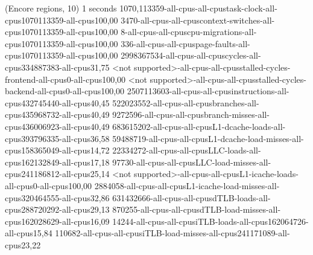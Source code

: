 (Encore regions, 10)
1 seconds
1070,113359-all-cpus-all-cpustask-clock-all-cpus1070113359-all-cpus100,00
3470-all-cpus-all-cpuscontext-switches-all-cpus1070113359-all-cpus100,00
8-all-cpus-all-cpuscpu-migrations-all-cpus1070113359-all-cpus100,00
336-all-cpus-all-cpuspage-faults-all-cpus1070113359-all-cpus100,00
2998367534-all-cpus-all-cpuscycles-all-cpus334887383-all-cpus31,75
<not supported>-all-cpus-all-cpusstalled-cycles-frontend-all-cpus0-all-cpus100,00
<not supported>-all-cpus-all-cpusstalled-cycles-backend-all-cpus0-all-cpus100,00
2507113603-all-cpus-all-cpusinstructions-all-cpus432745440-all-cpus40,45
522023552-all-cpus-all-cpusbranches-all-cpus435968732-all-cpus40,49
9272596-all-cpus-all-cpusbranch-misses-all-cpus436006923-all-cpus40,49
683615202-all-cpus-all-cpusL1-dcache-loads-all-cpus393796335-all-cpus36,58
59488719-all-cpus-all-cpusL1-dcache-load-misses-all-cpus158365049-all-cpus14,72
22334272-all-cpus-all-cpusLLC-loads-all-cpus162132849-all-cpus17,18
97730-all-cpus-all-cpusLLC-load-misses-all-cpus241186812-all-cpus25,14
<not supported>-all-cpus-all-cpusL1-icache-loads-all-cpus0-all-cpus100,00
2884058-all-cpus-all-cpusL1-icache-load-misses-all-cpus320464555-all-cpus32,86
631432666-all-cpus-all-cpusdTLB-loads-all-cpus288720292-all-cpus29,13
870255-all-cpus-all-cpusdTLB-load-misses-all-cpus162028629-all-cpus16,09
14244-all-cpus-all-cpusiTLB-loads-all-cpus162064726-all-cpus15,84
110682-all-cpus-all-cpusiTLB-load-misses-all-cpus241171089-all-cpus23,22
